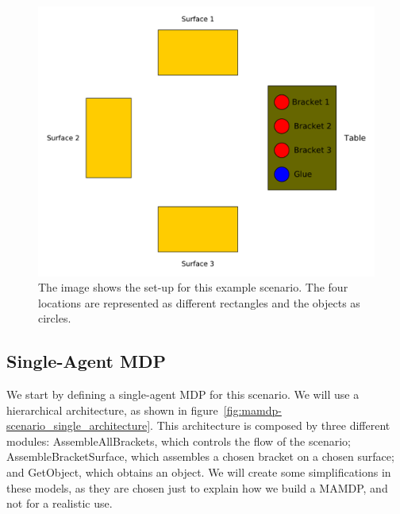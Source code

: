  \begin{figure}[ht!]
	\centering
	\includegraphics[scale=0.5]{img/coworker/mamdp/scenario.pdf}
	\caption[MAMDP example: scenario]{The image shows the set-up for this example scenario. The four locations are represented as different rectangles and the objects as circles. }
	\label{fig:mamdp-mamdp_scenario}
\end{figure}

\subsection{Single-Agent MDP}

We start by defining a single-agent MDP for this scenario. We will use a hierarchical architecture, as shown in figure~\ref{fig:mamdp-scenario_single_architecture}. This architecture is composed by three different modules: AssembleAllBrackets, which controls the flow of the scenario; AssembleBracketSurface, which assembles a chosen bracket on a chosen surface; and GetObject, which obtains an object. We will create some simplifications in these models, as they are chosen just to explain how we build a MAMDP, and not for a realistic use.

